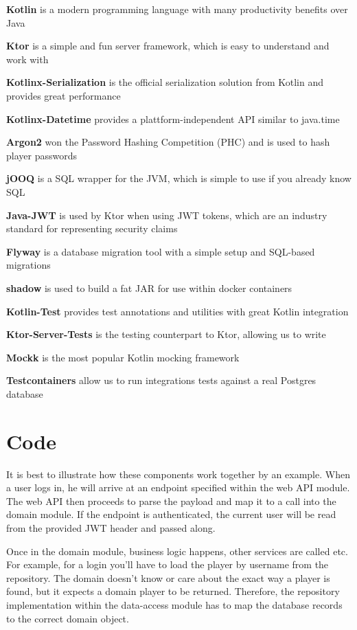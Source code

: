 \begin{compactitem}
    \item \textbf{Kotlin} is a modern programming language with many productivity benefits over Java
    \item \textbf{Ktor} is a simple and fun server framework, which is easy to understand and work with
    \item \textbf{Kotlinx-Serialization} is the official serialization solution from Kotlin and provides great performance
    \item \textbf{Kotlinx-Datetime} provides a plattform-independent API similar to java.time
    \item \textbf{Argon2} won the Password Hashing Competition (PHC) and is used to hash player passwords
    \item \textbf{jOOQ} is a SQL wrapper for the JVM, which is simple to use if you already know SQL
    \item \textbf{Java-JWT} is used by Ktor when using JWT tokens, which are an industry standard for representing security claims
    \item \textbf{Flyway} is a database migration tool with a simple setup and SQL-based migrations
    \item \textbf{shadow} is used to build a fat JAR for use within docker containers
    \item \textbf{Kotlin-Test} provides test annotations and utilities with great Kotlin integration
    \item \textbf{Ktor-Server-Tests} is the testing counterpart to Ktor, allowing us to write
    \item \textbf{Mockk} is the most popular Kotlin mocking framework
    \item \textbf{Testcontainers} allow us to run integrations tests against a real Postgres database
\end{compactitem}

\section{Code}
It is best to illustrate how these components work together by an example.
When a user logs in, he will arrive at an endpoint specified within the web API module.
The web API then proceeds to parse the payload and map it to a call into the domain module.
If the endpoint is authenticated, the current user will be read from the provided JWT header and passed along.

Once in the domain module, business logic happens, other services are called etc.
For example, for a login you'll have to load the player by username from the repository.
The domain doesn't know or care about the exact way a player is found, but it expects a domain player to be returned.
Therefore, the repository implementation within the data-access module has to map the database records to the correct domain object.

